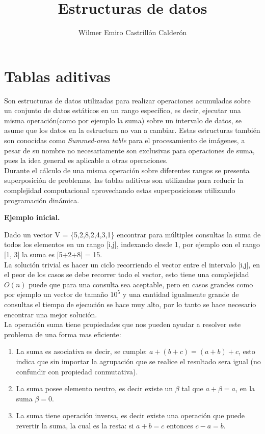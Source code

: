 \documentclass[12pt, a4paper]{article}
\title{\textbf{Estructuras de datos}}
\author{Wilmer Emiro Castrillón Calderón}
\newcommand{\subtitulo}[1]{\begin{center}\textbf{#1}\end{center}}
\begin{document}
	\maketitle
	
	
	\section{Tablas aditivas}
	\label{estructuras:tablas_aditivas}
	
	Son estructuras de datos utilizadas para realizar operaciones acumuladas sobre un conjunto de datos estáticos 
	en un rango específico, es decir, ejecutar una misma operación(como por ejemplo la suma) sobre un intervalo 
	de datos, se asume que los datos en la estructura no van a cambiar. Estas estructuras también son conocidas como 
	\textit{Summed-area table} para el procesamiento de imágenes, a pesar de su nombre no necesariamente son 
	exclusivas para operaciones de suma, pues la idea general es aplicable a otras operaciones.\\
	
	Durante el cálculo de una misma operación sobre diferentes rangos se presenta superposición de problemas, las 
	tablas aditivas son utilizadas para reducir la complejidad computacional aprovechando estas superposiciones
	utilizando programación dinámica.
	
	\subtitulo{Ejemplo inicial.}
	
	Dado un vector V = \{5,2,8,2,4,3,1\} encontrar para múltiples consultas la suma de todos los elementos en un rango
	[i,j], indexando desde 1, por ejemplo con el rango [1, 3] la suma es [5+2+8] = 15.\\
	
	La solución trivial es hacer un ciclo recorriendo el vector entre el intervalo [i,j], en el peor de los casos se
	debe recorrer todo el vector, esto tiene una complejidad $O(n)$ puede que para una consulta sea aceptable, pero
	en casos grandes como por ejemplo un vector de tamaño $10^{5}$ y una cantidad igualmente grande de consultas el
	tiempo de ejecución se hace muy alto, por lo tanto se hace necesario encontrar una mejor solución.\\
	
	La operación suma tiene propiedades que nos pueden ayudar a resolver este problema de una forma mas eficiente:
	\begin{enumerate}[1.]
		\item La suma es asociativa es decir, se cumple: $a+(b+c)=(a+b)+c$, esto indica que sin importar 
			la agrupación que se realice el resultado sera igual (no confundir con propiedad conmutativa).
		\item La suma posee elemento neutro, es decir existe un $\beta$ tal que $a + \beta = a$, en la suma 
			$\beta = 0$.
		\item La suma tiene operación inversa, es decir existe una operación que puede revertir la suma, la cual 
			es la resta: si $a+b=c$ entonces $c-a=b$.
	\end{enumerate}
	
\end{document}
